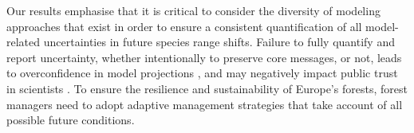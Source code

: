 Our results emphasise that it is critical to consider the diversity of modeling approaches that exist in order to ensure a consistent quantification of all model-related uncertainties in future species range shifts. Failure to fully quantify and report uncertainty, whether intentionally to preserve core messages, or not, leads to overconfidence in model projections \citep{Simmonds2024}, and may negatively impact public trust in scientists \citep{Howe2019}. To ensure the resilience and sustainability of Europe's forests, forest managers need to adopt adaptive management strategies that take account of all possible future conditions. 